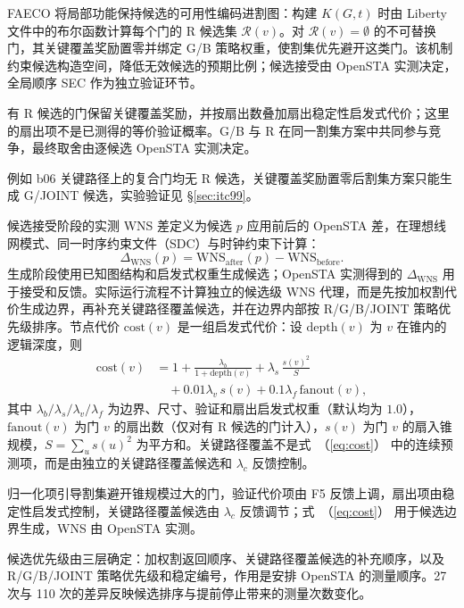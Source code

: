 \documentclass[twocolumn,10pt,fontset=windows]{ctexart}
\renewcommand{\eqref}[1]{\textup{（\ref{#1}）}}
\begin{document}
FAECO 将局部功能保持候选的可用性编码进割图：构建 $K(G, t)$ 时由 Liberty 文件中的布尔函数计算每个门的 R 候选集 $\mathcal{R}(v)$。对 $\mathcal{R}(v)=\emptyset$ 的不可替换门，其关键覆盖奖励置零并绑定 G/B 策略权重，使割集优先避开这类门。该机制约束候选构造空间，降低无效候选的预期比例；候选接受由 OpenSTA 实测决定，全局顺序 SEC 作为独立验证环节。

有 R 候选的门保留关键覆盖奖励，并按扇出数叠加扇出稳定性启发式代价；这里的扇出项不是已测得的等价验证概率。G/B 与 R 在同一割集方案中共同参与竞争，最终取舍由逐候选 OpenSTA 实测决定。

例如 b06 关键路径上的复合门均无 R 候选，关键覆盖奖励置零后割集方案只能生成 G/JOINT 候选，实验验证见 \S\ref{sec:itc99}。

候选接受阶段的实测 WNS 差定义为候选 $p$ 应用前后的 OpenSTA 差，在理想线网模式、同一时序约束文件（SDC）与时钟约束下计算：
\begin{equation}\label{eq:dtiming}
\Delta_{\mathrm{WNS}}(p) = \mathrm{WNS}_{\mathrm{after}}(p) - \mathrm{WNS}_{\mathrm{before}}.
\end{equation}
生成阶段使用已知图结构和启发式权重生成候选；OpenSTA 实测得到的 $\Delta_{\mathrm{WNS}}$ 用于接受和反馈。实际运行流程不计算独立的候选级 WNS 代理，而是先按加权割代价生成边界，再补充关键路径覆盖候选，并在边界内部按 R/G/B/JOINT 策略优先级排序。节点代价 $\mathrm{cost}(v)$ 是一组启发式代价：设 $\mathrm{depth}(v)$ 为 $v$ 在锥内的逻辑深度，则
{\small
\begin{equation}
\label{eq:cost}
\begin{aligned}
\mathrm{cost}(v) &= 1 + \frac{\lambda_b}{1+\mathrm{depth}(v)}
 + \lambda_s\,\frac{s(v)^2}{S} \\
&\quad + 0.01\lambda_v\,s(v)
 + 0.1\lambda_f\,\mathrm{fanout}(v),
\end{aligned}
\end{equation}
}
其中 $\lambda_b/\lambda_s/\lambda_v/\lambda_f$ 为边界、尺寸、验证和扇出启发式权重（默认均为 $1.0$），$\mathrm{fanout}(v)$ 为门 $v$ 的扇出数（仅对有 R 候选的门计入），$s(v)$ 为门 $v$ 的扇入锥规模，$S=\sum_u s(u)^2$ 为平方和。关键路径覆盖不是式~\eqref{eq:cost} 中的连续预测项，而是由独立的关键路径覆盖候选和 $\lambda_c$ 反馈控制。

归一化项引导割集避开锥规模过大的门，验证代价项由 F5 反馈上调，扇出项由稳定性启发式控制，关键路径覆盖候选由 $\lambda_c$ 反馈调节；式~\eqref{eq:cost} 用于候选边界生成，WNS 由 OpenSTA 实测。

候选优先级由三层确定：加权割返回顺序、关键路径覆盖候选的补充顺序，以及 R/G/B/JOINT 策略优先级和稳定编号，作用是安排 OpenSTA 的测量顺序。27 次与 110 次的差异反映候选排序与提前停止带来的测量次数变化。
\end{document}
